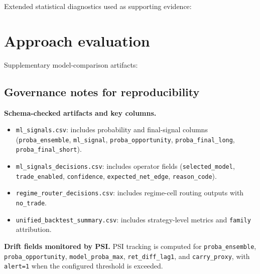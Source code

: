 \documentclass[a4paper,12pt]{extarticle}
\begin{document}
Extended statistical diagnostics used as supporting evidence:







\section{Approach evaluation}
\label{sec:approach_eval}

Supplementary model-comparison artifacts:

















\subsection{Governance notes for reproducibility}

\textbf{Schema-checked artifacts and key columns.}
\begin{itemize}
    \item \texttt{ml\_signals.csv}: includes probability and final-signal columns (\texttt{proba\_ensemble}, \texttt{ml\_signal}, \texttt{proba\_opportunity}, \texttt{proba\_final\_long}, \texttt{proba\_final\_short}).
    \item \texttt{ml\_signals\_decisions.csv}: includes operator fields (\texttt{selected\_model}, \texttt{trade\_enabled}, \texttt{confidence}, \texttt{expected\_net\_edge}, \texttt{reason\_code}).
    \item \texttt{regime\_router\_decisions.csv}: includes regime-cell routing outputs with \texttt{no\_trade}.
    \item \texttt{unified\_backtest\_summary.csv}: includes strategy-level metrics and \texttt{family} attribution.
\end{itemize}

\textbf{Drift fields monitored by PSI.}
PSI tracking is computed for \texttt{proba\_ensemble}, \texttt{proba\_opportunity}, \texttt{model\_proba\_max}, \texttt{ret\_diff\_lag1}, and \texttt{carry\_proxy}, with \texttt{alert=1} when the configured threshold is exceeded.
\end{document}
